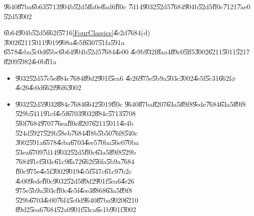 %
\begin{center}

\end{center}%

\begin{case}
\U{9640}\U{87ba}\U{6b63}\U{5713}\U{904b}\U{52d5}\U{8a0e}\U{8ad6}\U{ff0c}%
\U{7d14}\U{9032}\U{52d5}\U{7684}\U{904b}\U{52d5}\U{ff0c}\U{7121}\U{7ae0}%
\U{52d5}\U{3002}
\end{case}

\U{6b64}\U{904b}\U{52d5}\U{662f}\U{5716}\ref{FourClassics}\U{4e2d}\U{7684}(d)%
\U{3002}\U{6211}\U{5011}\U{9019}\U{908a}\U{4e5f}\U{6307}\U{51fa}\U{591a}%
\U{6578}\U{4eba}\U{5c0d}\U{65bc}\U{6b64}\U{904b}\U{52d5}\U{7684}\U{4e00}%
\U{4e9b}\U{932f}\U{8aa4}\U{89c0}\U{5ff5}\U{3002}\U{6211}\U{5011}\U{5217}%
\U{8209}\U{5982}\U{4e0b}\U{ff1a}

\begin{itemize}
\item \U{9032}\U{52d5}\U{7e5e}\U{884c}\U{7684}\U{89d2}\U{901f}\U{5ea6}%
\U{4e26}\U{975e}\U{5b9a}\U{503c}\U{3002}\U{4e5f}\U{5c31}\U{662f}$\dot{\phi}$%
\U{4e26}\U{4e0d}\U{662f}\U{96f6}\U{3002}

\item \U{9032}\U{52d5}\U{9032}\U{884c}\U{7684}\U{6642}\U{5019}\U{ff0c}%
\U{9640}\U{87ba}\U{8207}\U{63a5}\U{89f8}\U{9ede}\U{7684}\U{63a5}\U{89f8}%
\U{529b}\U{5411}\U{91cf}\U{4e5f}\U{6703}\U{9032}\U{884c}\U{5713}\U{5708}%
\U{5f0f}\U{7684}\U{9707}\U{76ea}\U{ff0c}\U{8207}\U{6211}\U{5011}\U{4e4b}%
\U{524d}\U{5927}\U{529b}\U{58eb}\U{7684}\U{4f8b}\U{5b50}\U{76f8}\U{540c}%
\U{3002}\U{591a}\U{6578}\U{4eba}\U{6703}\U{4ee5}\U{70ba}\U{56e0}\U{70ba}%
\U{53ea}\U{6709}\U{7d14}\U{9032}\U{52d5}\U{ff0c}\U{63a5}\U{89f8}\U{529b}%
\U{7684}\U{91cf}\U{503c}\U{61c9}\U{8a72}\U{662f}\U{56fa}\U{5b9a}\U{7684}%
\U{ff0c}\U{975e}\U{4e5f}\U{3002}\U{9019}\U{4e5f}\U{547c}\U{61c9}\U{7b2c}%
\U{4e00}\U{9ede}\U{ff0c}\U{9032}\U{52d5}\U{89d2}\U{901f}\U{5ea6}\U{4e26}%
\U{975e}\U{5b9a}\U{503c}\U{ff0c}\U{4e5f}\U{4ee3}\U{8868}\U{63a5}\U{89f8}%
\U{529b}\U{6703}\U{4e00}\U{76f4}\U{5c0d}\U{9640}\U{87ba}\U{9020}\U{6210}%
\U{89d2}\U{5ea6}\U{7684}\U{52a0}\U{901f}\U{53ca}\U{6e1b}\U{901f}\U{3002}
\end{itemize}

